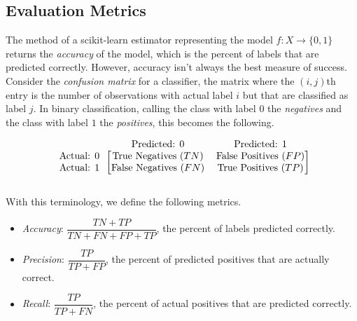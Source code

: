 \subsection*{Evaluation Metrics} %

The  method of a scikit-learn estimator representing the model $f:X\rightarrow\{0,1\}$ returns the \emph{accuracy} of the model, which is the percent of labels that are predicted correctly.
However, accuracy isn't always the best measure of success.
Consider the \emph{confusion matrix} for a classifier, the matrix where the $(i,j)$th entry is the number of observations with actual label $i$ but that are classified as label $j$.
In binary classification, calling the class with label $0$ the \emph{negatives} and the class with label $1$ the \emph{positives}, this becomes the following.

\begin{align*}
\begin{blockarray}{ccc}
& \textrm{Predicted: }0 & \textrm{Predicted: }1 \\
\begin{block}{c[cc]}
\textrm{Actual: }0 & \textrm{True Negatives } (TN) & \textrm{False Positives } (FP)\\
\textrm{Actual: }1 & \textrm{False Negatives } (FN) & \textrm{True Positives } (TP)\\
\end{block}\end{blockarray}
\end{align*}

With this terminology, we define the following metrics.
\begin{itemize}
\item \emph{Accuracy}: $\dfrac{TN + TP}{TN + FN + FP + TP}$, the percent of labels predicted correctly.
\item \emph{Precision}: $\dfrac{TP}{TP + FP}$, the percent of predicted positives that are actually correct.

\item \emph{Recall}: $\dfrac{TP}{TP + FN}$, the percent of actual positives that are predicted correctly.
\end{itemize}

